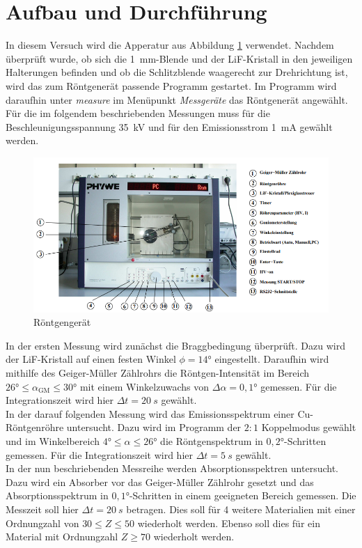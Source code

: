 \section{Aufbau und Durchführung}
In diesem Versuch wird die Apperatur aus Abbildung \ref{fig:Aufbau} verwendet.
Nachdem überprüft wurde, ob sich die \SI{1}{mm}-Blende und der LiF-Kristall in den jeweiligen Halterungen befinden und ob die Schlitzblende waagerecht zur Drehrichtung ist,
wird das zum Röntgenerät passende Programm gestartet. Im Programm wird daraufhin unter \textit{measure} im Menüpunkt \textit{Messgeräte} das Röntgenerät angewählt.
Für die im folgendem beschriebenden Messungen muss für die Beschleunigungsspannung \SI{35}{kV} und für den Emissionsstrom \SI{1}{mA} gewählt werden.
\begin{figure}[H]
  \centering
  \includegraphics[width=\linewidth-100pt,height=\textheight-100pt,keepaspectratio]{Text/Bilder/Aufbau.png}
  \caption{Röntgengerät \cite[4]{sample}}
  \label{fig:Aufbau}
\end{figure}
In der ersten Messung wird zunächst die Braggbedingung überprüft. Dazu wird der LiF-Kristall auf einen festen Winkel $\phi=14°$ eingestellt.
Daraufhin wird mithilfe des Geiger-Müller Zählrohrs die Röntgen-Intensität im Bereich $26° \le \alpha_\text{GM} \le 30°$  mit einem Winkelzuwachs von $\Delta \alpha = 0,1°$ gemessen.
Für die Integrationszeit wird hier $\Delta t =\SI{20}{s}$ gewählt. \\
In der darauf folgenden Messung wird das Emissionsspektrum einer Cu-Röntgenröhre untersucht. Dazu wird im Programm der $2:1$ Koppelmodus gewählt und im Winkelbereich $4° \le \alpha \le 26°$ die
Röntgenspektrum in $0,2°$-Schritten gemessen. Für die Integrationszeit wird hier $\Delta t = \SI{5}{s}$ gewählt. \\
In der nun beschriebenden Messreihe werden Absorptionsspektren untersucht.
Dazu wird ein Absorber vor das Geiger-Müller Zählrohr gesetzt und das Absorptionsspektrum in $0,1°$-Schritten in einem geeigneten Bereich gemessen. Die Messzeit soll hier
$\Delta t = \SI{20}{s}$ betragen. Dies soll für 4 weitere Materialien mit einer Ordnungzahl von $30 \le Z \le 50$ wiederholt werden. Ebenso soll dies für ein Material mit Ordnungzahl $Z \ge 70$ wiederholt werden.
